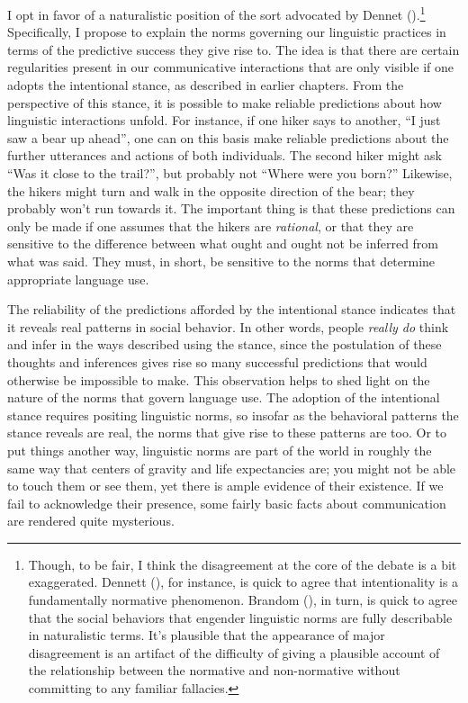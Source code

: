 I opt in favor of a naturalistic position of the sort advocated by Dennet (\citeyear{Dennett:2010,Dennett:1991,Dennett:1987}).\footnote{Though, to be fair, I think the disagreement at the core of the debate is a bit exaggerated. Dennett (\citeyear{Dennett:2010,Dennett:1987}), for instance, is quick to agree that intentionality is a fundamentally normative phenomenon. Brandom (\citeyear{Brandom:1994,Brandom:2010}), in turn, is quick to agree that the social behaviors that engender linguistic norms are fully describable in naturalistic terms. It's plausible that the appearance of major disagreement is an artifact of the difficulty of giving a plausible account of the relationship between the normative and non-normative without committing to any familiar fallacies.} Specifically, I propose to explain the norms governing our linguistic practices in terms of the predictive success they give rise to. The idea is that there are certain regularities present in our communicative interactions that are only visible if one adopts the intentional stance, as described in earlier chapters. From the perspective of this stance, it is possible to make reliable predictions about how linguistic interactions unfold. For instance, if one hiker says to another, ``I just saw a bear up ahead'', one can on this basis make reliable predictions about the further utterances and actions of both individuals. The second hiker might ask ``Was it close to the trail?'', but probably not ``Where were you born?'' Likewise, the hikers might turn and walk in the opposite direction of the bear; they probably won't run towards it. The important thing is that these predictions can only be made if one assumes that the hikers are \textit{rational}, or that they are sensitive to the difference between what ought and ought not be inferred from what was said. They must, in short, be sensitive to the norms that determine appropriate language use. 

The reliability of the predictions afforded by the intentional stance indicates that it reveals real patterns in social behavior. In other words, people \textit{really do} think and infer in the ways described using the stance, since the postulation of these thoughts and inferences gives rise so many successful predictions that would otherwise be impossible to make. This observation helps to shed light on the nature of the norms that govern language use. The adoption of the intentional stance requires positing linguistic norms, so insofar as the behavioral patterns the stance reveals are real, the norms that give rise to these patterns are too. Or to put things another way, linguistic norms are part of the world in roughly the same way that centers of gravity and life expectancies are; you might not be able to touch them or see them, yet there is ample evidence of their existence. If we fail to acknowledge their presence, some fairly basic facts about communication are rendered quite mysterious.

